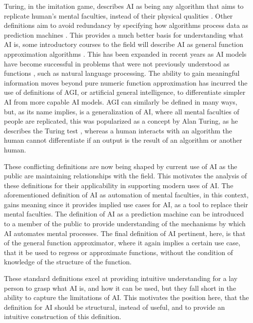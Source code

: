 \documentclass[stu,12pt]{apa7}
\theoremstyle{definition}
\begin{document}
Turing, in the imitation game, describes AI as being any algorithm that aims to replicate human's mental faculties, instead of their physical qualities \parencite{turing2016imitation}. Other definitions aim to avoid redundancy by specifying how algorithms process data as prediction machines \parencite{russell1995modern}. This provides a much better basis for understanding what AI is, some introductory courses to the field will describe AI as general function approximation algorithms \parencite{lecun2015deep}. This has been expanded in recent years as AI models have become successful in problems that were not previously understood as functions \parencite{bommasani2021foundation}, such as natural language processing. The ability to gain meaningful information moves beyond pure numeric function approximation has incurred the use of definitions of AGI, or artificial general intelligence, to differentiate simpler AI from more capable AI models. AGI can similarly be defined in many ways, but, as its name implies, is a generalization of AI, where all mental faculties of people are replicated, this was popularized as a concept by Alan Turing, as he describes the Turing test \parencite{turing2016imitation,russell1995modern}, whereas a human interacts with an algorithm the human cannot differentiate if an output is the result of an algorithm or another human.

These conflicting definitions are now being shaped by current use of AI as the public are maintaining relationships with the field. This motivates the analysis of these definitions for their applicability in supporting modern uses of AI. The aforementioned definition of AI as automation of mental faculties, in this context, gains meaning since it provides implied use cases for AI, as a tool to replace their mental faculties. The definition of AI as a prediction machine can be introduced to a member of the public to provide understanding of the mechanisms by which AI automates mental processes. The final definition of AI pertinent, here, is that of the general function approximator, where it again implies a certain use case, that it be used to regress or approximate functions, without the condition of knowledge of the structure of the function.

These standard definitions excel at providing intuitive understanding for a lay person to grasp what AI is, and how it can be used, but they fall short in the ability to capture the limitations of AI. This motivates the position here, that the definition for AI should be structural, instead of useful, and to provide an intuitive construction of this definition.
\end{document}
